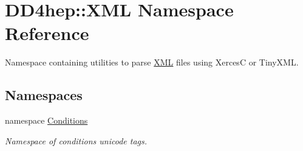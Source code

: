 \hypertarget{namespace_d_d4hep_1_1_x_m_l}{
\section{DD4hep::XML Namespace Reference}
\label{namespace_d_d4hep_1_1_x_m_l}
}


Namespace containing utilities to parse \hyperlink{namespace_d_d4hep_1_1_x_m_l}{XML} files using XercesC or TinyXML.  
\subsection*{Namespaces}
\begin{DoxyCompactItemize}
\item 
namespace \hyperlink{namespace_d_d4hep_1_1_x_m_l_1_1_conditions}{Conditions}


\begin{DoxyCompactList}\small\item\em Namespace of conditions unicode tags. \item\end{DoxyCompactList}\end{DoxyCompactItemize}

